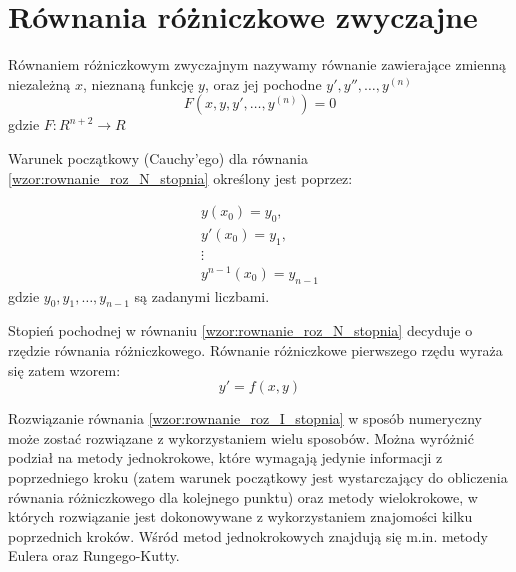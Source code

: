 



\renewcommand{\tablename}{Tabela}

\pagestyle{empty}
\stronatytulowa

\newpage
\setcounter{page}{1}

\newpage
\tableofcontents

\newpage
\pagestyle{plain}

\section{Równania różniczkowe zwyczajne}

Równaniem różniczkowym zwyczajnym nazywamy równanie zawierające zmienną niezależną $x$, nieznaną funkcję $y$, oraz jej pochodne $y', y'', \hdots, y^{(n)}$ \cite[str. 7]{BCh_2001}
\begin{equation}
	\label{wzor:rownanie_roz_N_stopnia}
	F(x,y,y',\hdots,y^{(n)}) = 0
\end{equation}
gdzie $F:R^{n+2} \rightarrow R$

Warunek początkowy (Cauchy'ego) dla równania \ref{wzor:rownanie_roz_N_stopnia} określony jest poprzez: 

\begin{equation}
\begin{array}{c}
y(x_0)       =  y_0,     \\
y'(x_0)      =  y_1,     \\
\vdots			   	     \\
y^{n-1}(x_0) = y_{n-1}
\end{array}
\end{equation}
gdzie $y_0, y_1, \hdots, y_{n-1}$ są zadanymi liczbami.

Stopień pochodnej w równaniu \ref{wzor:rownanie_roz_N_stopnia} decyduje o rzędzie równania różniczkowego. Równanie różniczkowe pierwszego rzędu wyraża się zatem wzorem:
\begin{equation}
	\label{wzor:rownanie_roz_I_stopnia}
	y' = f(x,y)
\end{equation}

Rozwiązanie równania \ref{wzor:rownanie_roz_I_stopnia} w sposób numeryczny może zostać rozwiązane z wykorzystaniem wielu sposobów. Można wyróżnić podział na metody jednokrokowe, które wymagają jedynie informacji z poprzedniego kroku (zatem warunek początkowy jest wystarczający do obliczenia równania różniczkowego dla kolejnego punktu) oraz metody wielokrokowe, w których rozwiązanie jest dokonowywane z wykorzystaniem znajomości kilku poprzednich kroków. Wśród metod jednokrokowych znajdują się m.in. metody Eulera oraz Rungego-Kutty.

